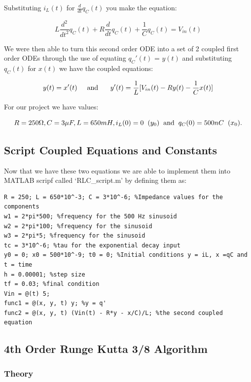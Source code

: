 \documentclass[11pt,a4paper]{article}
\begin{document}
Substituting $i_L(t)$ for $\frac{d}{dt}q_C(t)$ you make the equation:

\[ L \frac{d^2}{dt^2}q_C(t) + R\frac{d}{dt}q_C(t) + \frac{1}{C}q_C(t) = V_{in}(t)\]

We were then able to turn this second order ODE into a set of 2 coupled first order ODEs through the use of equating $q_C'(t)$ = $y(t)$ and substituting $q_C(t)$ for $x(t)$ we have the coupled equations:

\[y(t) = x'(t) \text{\hspace{5mm}and \hspace{5mm}}y'(t) = \frac{1}{L}[V_{in}(t)  - Ry(t) - \frac{1}{C}x(t)] \]

For our project we have values:

\[R = 250 \Omega, C = 3 \mu F , L = 650 mH, i_L(0) = 0 \hspace{2mm} (y_0) \text{\hspace{2mm}and\hspace{2mm}} q_C(0) = 500nC \hspace{2mm} (x_0).\]

\subsection{Script Coupled Equations and Constants}

Now that we have these two equations we are able to implement them into MATLAB scripf called `RLC\_script.m' by defining them as:

\begin{verbatim}
R = 250; L = 650*10^-3; C = 3*10^-6; %Impedance values for the components
w1 = 2*pi*500; %frequency for the 500 Hz sinusoid
w2 = 2*pi*100; %frequency for the sinusoid
w3 = 2*pi*5; %frequency for the sinusoid
tc = 3*10^-6; %tau for the exponential decay input
y0 = 0; x0 = 500*10^-9; t0 = 0; %Initial conditions y = iL, x =qC and t = time
h = 0.00001; %step size
tf = 0.03; %final condition
Vin = @(t) 5;
func1 = @(x, y, t) y; %y = q'
func2 = @(x, y, t) (Vin(t) - R*y - x/C)/L; %the second coupled equation
\end{verbatim}

\subsection{4th Order Runge Kutta 3/8 Algorithm}
\subsubsection{Theory}
\end{document}
